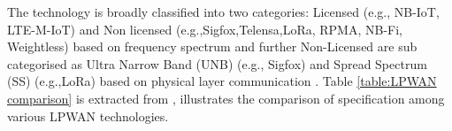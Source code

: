 \documentclass[12pt]{article}
\begin{document}
The technology is broadly classified into two categories: Licensed (e.g., NB-IoT, LTE-M-IoT) and Non licensed (e.g.,Sigfox,Telensa,LoRa, RPMA, NB-Fi, Weightless) based on frequency spectrum \cite{8612009} and further Non-Licensed are sub categorised as Ultra Narrow Band (UNB) (e.g., Sigfox) and Spread Spectrum (SS) (e.g.,LoRa) based on physical layer communication \cite{8544414}. Table \ref{table:LPWAN comparison} is extracted from \cite{LPWANspecs}, illustrates the comparison of specification among various LPWAN technologies. \par

\begin{table}[H]
\caption{Technical specification comparison of LPWAN technologies \cite{LPWANspecs}}
\end{table}
\end{document}
